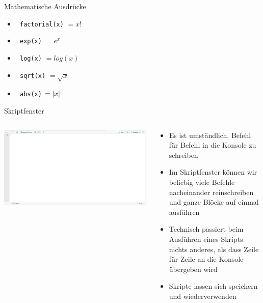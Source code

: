 \documentclass[xcolor=dvipsnames, aspectratio = 169]{beamer}
\begin{document}
\begin{frame}[fragile]{Mathematische Ausdrücke}
	\begin{itemize}
		\item \verb+ factorial(x)+ $= x!$
		\item \verb+ exp(x)+ $=e^x$
		\item \verb+ log(x)+ $=log(x)$
		\item \verb+ sqrt(x)+ $=\sqrt{x}$
		\item \verb+ abs(x)+ $=\left\lvert x \right\rvert$
	\end{itemize}
\end{frame}

\begin{frame}{Skriptfenster}
	\begin{columns}[T]
	\begin{column}{0.6\textwidth}
	\includegraphics[width=\textwidth]{Rstudio_interface_i}
	\end{column}
	\begin{column}{0.4\textwidth}
	\begin{itemize}
		\item Es ist umständlich, Befehl für Befehl in die Konsole zu schreiben
		\item Im Skriptfenster können wir beliebig viele Befehle nacheinander reinschreiben und ganze Blöcke auf einmal ausführen
		\item Technisch passiert beim Ausführen eines Skripts nichts anderes, als dass Zeile für Zeile an die Konsole übergeben wird
		\item Skripte lassen sich speichern und wiederverwenden
	\end{itemize}
	\end{column}
\end{columns}
\end{frame}
\end{document}
